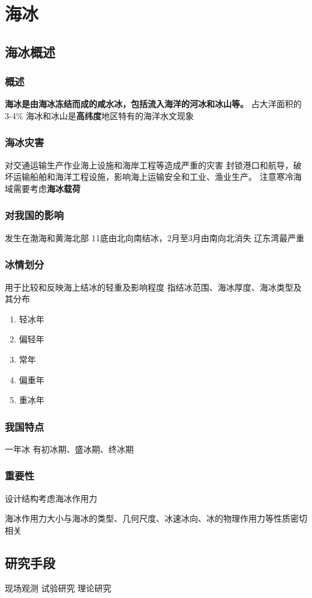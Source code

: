 \section{海冰}
\subsection{海冰概述}
\subsubsection{概述}
\textbf{海冰是由海冰冻结而成的咸水冰，包括流入海洋的河冰和冰山等。}
占大洋面积的3-4\%
海冰和冰山是\textbf{高纬度}地区特有的海洋水文现象
\subsubsection{海冰灾害}
对交通运输生产作业海上设施和海岸工程等造成严重的灾害
封锁港口和航导，破坏运输船舶和海洋工程设施，影响海上运输安全和工业、渔业生产。
注意寒冷海域需要考虑\textbf{海冰载荷}
\subsubsection{对我国的影响}
发生在渤海和黄海北部
11底由北向南结冰，2月至3月由南向北消失
辽东湾最严重
\subsubsection{冰情划分}
用于比较和反映海上结冰的轻重及影响程度
指结冰范围、海冰厚度、海冰类型及其分布
\begin{enumerate}[1)]
	\item 轻冰年
	\item 偏轻年
	\item 常年
	\item 偏重年
	\item 重冰年
\end{enumerate}
\subsubsection{我国特点}
一年冰
有初冰期、盛冰期、终冰期
\subsubsection{重要性}
设计结构考虑海冰作用力

海冰作用力大小与海冰的类型、几何尺度、冰速冰向、冰的物理作用力等性质密切相关
\subsection{研究手段}
现场观测
试验研究
理论研究
